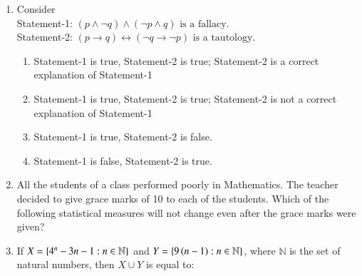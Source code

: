 \documentclass[journal,12pt,twocolumn]{IEEEtran}
\theoremstyle{remark}
\begin{document}
\begin{enumerate}
    \item Consider \\
    Statement-1: $(p \land \neg q) \land (\neg p \land q) \text{ is a fallacy.}$\\
    Statement-2: $(p \rightarrow q) \leftrightarrow (\neg q \rightarrow \neg p) \text{ is a tautology.}$
    
    \hfill{}
    \begin{enumerate}[label=(\alph*)]
        \item Statement-1 is true, Statement-2 is true; Statement-2 is a correct explanation of Statement-1
        \item Statement-1 is true, Statement-2 is true; Statement-2 is not a correct explanation of Statement-1
        \item Statement-1 is true, Statement-2 is false.
        \item Statement-1 is false, Statement-2 is true.
    \end{enumerate}
    
    \item All the students of a class performed poorly in Mathematics. The teacher decided to give grace marks of 10 to each of the students. Which of the following statistical measures will not change even after the grace marks were given?
    
    \hfill{}
    \begin{enumerate}[label=(\alph*)]
    \end{enumerate}
    
    \item If $X = \left\{4^n - 3n - 1 : n \in \mathbb{N}\right\}$ and $Y = \left\{9 \left(n - 1\right) : n \in \mathbb{N}\right\}$, where $\mathbb{N}$ is the set of natural numbers, then $X \cup Y$ is equal to:
    
    \hfill{}
    \begin{enumerate}[label=(\alph*)]
    \end{enumerate}
    

\end{enumerate}
\end{document}
